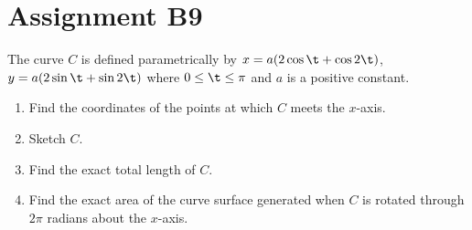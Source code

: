 \section{Assignment B9}

\begin{problem}
    The curve $C$ is defined parametrically by $x = a(2\cos\t + \cos2\t)$, $y = a(2\sin\t + \sin2\t)$ where $0 \leq \t \leq \pi$ and $a$ is a positive constant.

    \begin{enumerate}
        \item Find the coordinates of the points at which $C$ meets the $x$-axis.
        \item Sketch $C$.
        \item Find the exact total length of $C$.
        \item Find the exact area of the curve surface generated when $C$ is rotated through $2\pi$ radians about the $x$-axis.
    \end{enumerate}
\end{problem}
